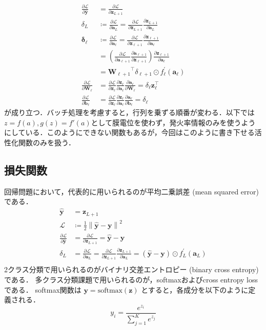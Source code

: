 \begin{align}
\frac{\partial \mathcal{L}}{\partial \hat{\mathbf{y}}}&=\frac{\partial \mathcal{L}}{\partial \mathbf{z}_{L+1}}\\
\delta_L&\coloneqq \frac{\partial \mathcal{L}}{\partial \mathbf{a}_L}=\frac{\partial \mathcal{L}}{\partial \mathbf{z}_{L+1}} \frac{\partial \mathbf{z}_{L+1}}{\partial \mathbf{a}_L}\\
\mathbf{\delta}_\ell&\coloneqq \frac{\partial \mathcal{L}}{\partial \mathbf{a}_{\ell}}=\frac{\partial \mathcal{L}}{\partial \mathbf{z}_{\ell+1}} \frac{\partial \mathbf{z}_{\ell+1}}{\partial \mathbf{a}_\ell}\\
&=\left(\frac{\partial \mathcal{L}}{\partial \mathbf{a}_{\ell+1}}\frac{\partial \mathbf{a}_{\ell+1}}{\partial \mathbf{z}_{\ell+1}}\right)\frac{\partial \mathbf{z}_{\ell+1}}{\partial \mathbf{a}_{\ell}}\\
&={\mathbf{W}_{\ell+1}}^\top \delta_{\ell+1} \odot f_\ell^{\prime}\left(\mathbf{a}_{\ell}\right)\\
\frac{\partial \mathcal{L}}{\partial \mathbf{W}_\ell}&=\frac{\partial \mathcal{L}}{\partial \mathbf{z}_\ell} \frac{\partial \mathbf{z}_\ell}{\partial \mathbf{a}_\ell} \frac{\partial \mathbf{a}_\ell}{\partial \mathbf{W}_\ell}=\delta_\ell \mathbf{z}_\ell^\top\\
\frac{\partial \mathcal{L}}{\partial \mathbf{b}_\ell}&=\frac{\partial \mathcal{L}}{\partial \mathbf{z}_\ell} \frac{\partial \mathbf{z}_\ell}{\partial \mathbf{a}_\ell} \frac{\partial \mathbf{a}_\ell}{\partial \mathbf{b}_\ell}=\delta_\ell
\end{align}
が成り立つ．バッチ処理を考慮すると，行列を乗ずる順番が変わる．以下では$z=f(a), g(z)=f'(a)$として膜電位を使わず，発火率情報のみを使うようにしている．このようにできない関数もあるが，今回はこのように書き下せる活性化関数のみを扱う．
\subsection{損失関数}
回帰問題において，代表的に用いられるのが平均二乗誤差 (mean squared error) である．
\begin{align}
\hat{\mathbf{y}} &= \mathbf{z}_{L+1}\\
\mathcal{L}&\coloneqq \frac{1}{2}\left\|\hat{\mathbf{y}}-\mathbf{y}\right\|^{2}\\
\frac{\partial \mathcal{L}}{\partial \hat{\mathbf{y}}}&=\frac{\partial \mathcal{L}}{\partial \mathbf{z}_{L+1}}=\hat{\mathbf{y}}-\mathbf{y}\\
\delta_L&=\frac{\partial \mathcal{L}}{\partial \mathbf{a}_L}=\frac{\partial \mathcal{L}}{\partial \mathbf{z}_{L+1}} \frac{\partial \mathbf{z}_{L+1}}{\partial \mathbf{a}_L}=\left(\hat{\mathbf{y}}-\mathbf{y}\right) \odot f_L^{\prime}\left(\mathbf{a}_L\right)\\
\end{align}
2クラス分類で用いられるのがバイナリ交差エントロピー (binary cross entropy) である．
多クラス分類課題で用いられるのが，softmaxおよびcross entropy lossである．
softmax関数は $\mathbf{y} = \text{softmax}(\mathbf{z})$ とすると，各成分を以下のように定義される．
\begin{equation}
y_i = \frac{e^{z_i}}{\sum_{j=1}^K e^{z_j}}
\end{equation}
